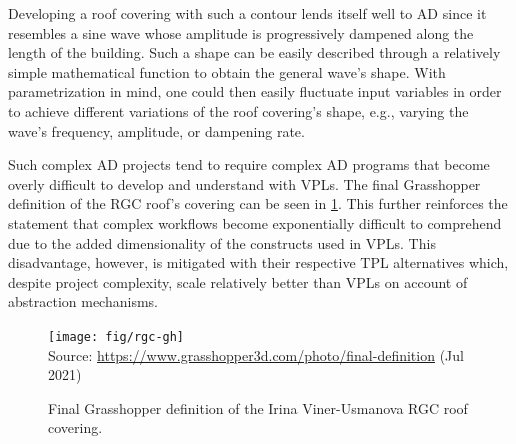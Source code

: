 Developing a roof covering with such a contour lends itself well to \ac{AD}
since it resembles a sine wave whose amplitude is progressively dampened along
the length of the building.  Such a shape can be easily described through a
relatively simple mathematical function to obtain the general wave's shape.
With parametrization in mind, one could then easily fluctuate input variables in
order to achieve different variations of the roof covering's shape, e.g.,
varying the wave's frequency, amplitude, or dampening rate.

Such complex \ac{AD} projects tend to require complex \ac{AD} programs that
become overly difficult to develop and understand with \acp{VPL}.  The final
Grasshopper definition of the \ac{RGC} roof's covering can be seen in
\cref{fig:related.ad.vpl-scalability.rgc-gh}.  This further reinforces the
statement that complex workflows become exponentially difficult to comprehend
due to the added dimensionality of the constructs used in \acp{VPL}.  This
disadvantage, however, is mitigated with their respective \ac{TPL} alternatives
which, despite project complexity, scale relatively better than \acp{VPL} on
account of abstraction mechanisms.

\begin{landscape}
\begin{figure}
  \texttt{[image: fig/rgc-gh]}\\
  {\scriptsize
  Source: \url{https://www.grasshopper3d.com/photo/final-definition} (Jul 2021)
  }
  \caption[Grasshopper definition of the \acl{RGC} roof covering]{
    Final Grasshopper definition of the Irina Viner-Usmanova \ac{RGC} roof
    covering.}%
  \label{fig:related.ad.vpl-scalability.rgc-gh}
\end{figure}
\end{landscape}
